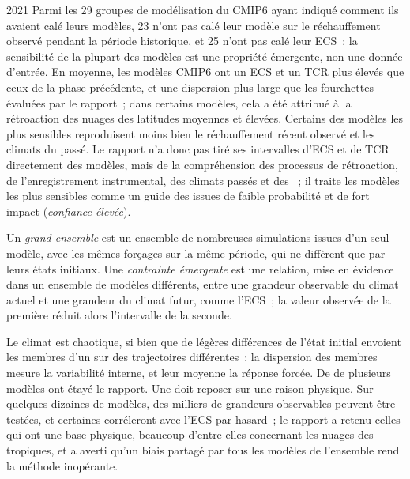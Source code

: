 \begin{dated}{2021}
Parmi les 29 groupes de modélisation du CMIP6 ayant indiqué comment ils avaient calé leurs modèles, 23 n'ont pas
calé leur modèle sur le réchauffement observé pendant la période historique, et
25 n'ont pas calé leur ECS~: la sensibilité de la plupart des modèles est une
propriété émergente, non une donnée d'entrée. En moyenne, les modèles CMIP6 ont un ECS et un
TCR plus élevés que ceux de la phase précédente, et une dispersion plus large que les
fourchettes évaluées par le rapport~; dans certains modèles, cela a été attribué à la
rétroaction des nuages des latitudes moyennes et élevées. Certains des modèles les plus sensibles
reproduisent moins bien le réchauffement récent observé et les climats du passé.
Le rapport n'a donc pas tiré ses intervalles d'ECS et de TCR directement des
modèles, mais de la compréhension des processus de rétroaction,
de l'enregistrement instrumental, des climats passés et des ~; il traite les modèles les plus sensibles comme un guide des
issues de faible probabilité et de fort impact (\emph{confiance élevée}).
\end{dated}

\begin{definition}\label{def:b3:climate-models:evaluation}
Un \emph{grand ensemble} est un ensemble de nombreuses simulations
issues d'un seul modèle, avec les mêmes forçages sur la même période, qui ne diffèrent
que par leurs états initiaux. Une \emph{contrainte
émergente} est une relation, mise en évidence dans un
ensemble de modèles différents, entre une grandeur observable du
climat actuel et une grandeur du climat futur, comme l'ECS~; la
valeur observée de la première réduit alors l'intervalle de la seconde.
\end{definition}

Le climat est chaotique, si bien que de légères différences de l'état initial envoient les
membres d'un  sur des trajectoires différentes~: la dispersion des
membres mesure la variabilité interne, et leur moyenne la réponse
forcée. De  de plusieurs modèles ont étayé le rapport. Une
 doit reposer sur une raison physique. Sur quelques dizaines de modèles,
des milliers de grandeurs observables peuvent être testées, et certaines corréleront avec
l'ECS par hasard~; le rapport a retenu celles qui ont une base physique, beaucoup
d'entre elles concernant les nuages des tropiques, et a averti qu'un biais partagé par tous
les modèles de l'ensemble rend la méthode inopérante.

